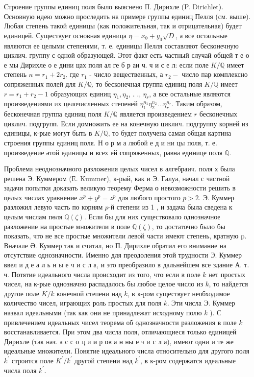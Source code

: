 \documentclass[10pt]{article}
\begin{document}
Строение группы единиц поля было выяснено П. Дирихле (P. Dirichlet). Основную идею можно проследить на примере группы единиц Пелля (см. выше). Любая степень такой единицы (как положительная, так и отрицательная) будет единицей. Существует основная единица $\eta=x_{0}+y_{0} \sqrt{D}$, а все остальные являются ее целыми степенями, т. е. единицы Пелля составляют бесконечную циклич. группу с одной образующей. Этот факт есть частный случай общей т е о е мы Дирихле о е дини цах поля ал ге б р аи ч. ч и с е л: если поле $K / \mathbb{Q}$ имеет степень $n=r_{1}+2 r_{2}$, где $r_{1}$ - число вещественных, а $r_{2}-$ число пар комплексно сопряженных полей для $K / \mathbb{Q}$, то бесконечная группа единиц поля $K / \mathbb{Q}$ имеет $r=r_{1}+r_{2}-1$ образующих единиц $\eta_{1}, \eta_{2}$, . ., $\eta_{r}$, а все остальные являются произведениями их целочисленных степеней $\eta_{1}^{n_{1}} \eta_{2}^{n_{2}} \ldots \eta_{r}^{n_{r}}$. Таким образом, бесконечная группа единиц поля $K / \mathbb{Q}$ является произведением $r$ бесконечных циклич. подгрупп. Если домножить ее на конечную циклич. подгруппу корней из единицы, к-рые могут быть в $K / \mathbb{Q}$, то будет получена самая общая картина строения группы единиц поля. Н о р м а любой е д и ни цы поля, т. е. произведение әтой единицы и всех ей сопряженных, равна единице поля $\mathbb{Q}$.



Проблема неоднозначного разложения целых чисел в алгебраич. поля х была решена Э. Куммером (Е. Kummer), к-рый, как и Э. Галуа, начал с частной задачи попытки доказать великую теорему Ферма о невозможности решить в целых числах уравнение $x^{p}+y^{p}=z^{p}$ для любого простого $p>2$. Э. Куммер разложил левую часть по корням $p$-й степени из 1 , и задача была сведена к целым числам пөля $\mathbb{Q}(\zeta)$. Если бы для них существовало однозначное разложение на простые множители в поле $\mathbb{Q}(\zeta)$, то достаточно было бы показать, что не все простые множители левой части имеют степень, кратную p. Вначале Ә. Куммер так и считал, но П. Дирихле обратил его внимание на отсутствие однозначности. Именно для преодоления этой трудности Э. Куммер ввел и д е а л ь н ы е ч и с л а, и это преобразило в дальнейшем все здание А. т. ч. Потятие идеального числа происходит из того, что если в поле $k$ нет простых чисел, на к-рые однозначно распадалось бы любое целое число из $k$, то найдется другое поле $K / k$ конечной степени над $k$, в к-ром существует необходимое количество чисел, играющих роль простых для поля $k$. Эти числа Э. Куммер назвал идеальными (так как они не принадлежат исходному полю $k$ ). С привлечением идеальных чисел теорема об однозначности разложения в поле $k$ восстанавливается. При этом два числа поля, отличающиеся только единицей Дирихле (так наз. а с с о ц и и р ов а н ны е ч и с л а), имеют одни и те же идеальные множители. Понятие идеального числа относительно для другого поля $k^{\prime}$ строится поле $K^{\prime} / k^{\prime}$ другой степени над $k^{\prime}$, в к-ром содержатся идеальные числа поля $k^{\prime}$.
\end{document}
